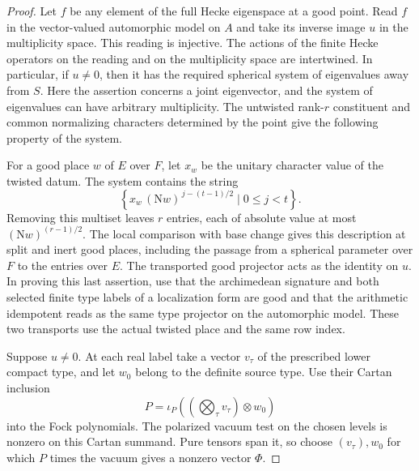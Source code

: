 \begin{proof}
Let \(f\) be any element of the full Hecke eigenspace at a
good point. Read \(f\) in the vector-valued automorphic model
on \(A\) and take its inverse image \(u\) in the multiplicity
space. This reading is injective. The actions of the finite
Hecke operators on the reading and on the multiplicity space
are intertwined. In particular, if \(u\ne0\), then it has
the required spherical system of eigenvalues away from \(S\).
Here the assertion concerns a joint eigenvector, and the
system of eigenvalues can have arbitrary multiplicity.
The untwisted rank-\(r\) constituent and common normalizing
characters determined by the point give the following
property of the system.

For a good place \(w\) of \(E\)
over \(F\), let \(x_w\) be the unitary character value
of the twisted datum. The system contains the string
\[
 \left\{ x_w\,(\mathrm Nw)^{\,j-(t-1)/2}\mid 0\le j<t\right\}.
\]
Removing this multiset leaves \(r\) entries,
each of absolute value at most \((\mathrm Nw)^{(r-1)/2}\).
The local comparison with base change gives this description
at split and inert good places, including the passage from a
spherical parameter over \(F\) to the entries over \(E\).
The transported good projector acts as the identity on
\(u\). In proving this last assertion, use that the
archimedean signature and both selected finite type labels
of a localization form are good and that the arithmetic
idempotent reads as the same type projector on the
automorphic model. These two transports use the actual
twisted place and the same row index. \label{cor:selected-point-adjoint-1}

Suppose \(u\ne0\). At each real label take a vector \(v_\tau\)
of the prescribed lower compact type, and let \(w_0\) belong to
the definite source type. Use their Cartan inclusion
\[
 P=\iota_P((\bigotimes_\tau v_\tau)\otimes w_0)
\]
into the
Fock polynomials. The polarized vacuum test on the chosen
levels is nonzero on this Cartan summand. Pure tensors span it,
so choose \((v_\tau),w_0\) for which \(P\) times the vacuum
gives a nonzero vector \(\Phi\).


\end{proof}

